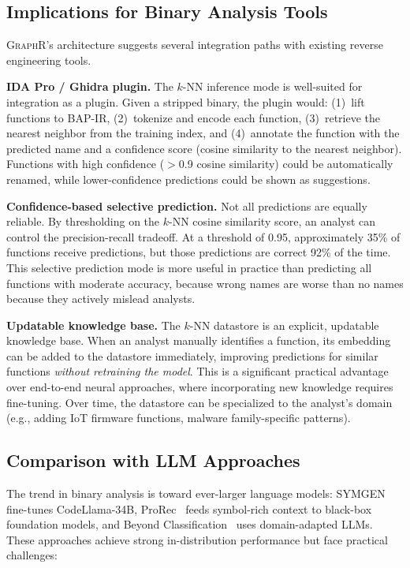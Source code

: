 \documentclass[sigconf,nonacm]{acmart}
\newcommand{\sysname}{\textsc{GraphR}}
\begin{document}
\subsection{Implications for Binary Analysis Tools}

\sysname{}'s architecture suggests several integration paths with existing reverse engineering tools.

\textbf{IDA Pro / Ghidra plugin.} The $k$-NN inference mode is well-suited for integration as a plugin. Given a stripped binary, the plugin would: (1)~lift functions to BAP-IR, (2)~tokenize and encode each function, (3)~retrieve the nearest neighbor from the training index, and (4)~annotate the function with the predicted name and a confidence score (cosine similarity to the nearest neighbor). Functions with high confidence ($>$0.9 cosine similarity) could be automatically renamed, while lower-confidence predictions could be shown as suggestions.

\textbf{Confidence-based selective prediction.} Not all predictions are equally reliable. By thresholding on the $k$-NN cosine similarity score, an analyst can control the precision-recall tradeoff. At a threshold of 0.95, approximately 35\% of functions receive predictions, but those predictions are correct 92\% of the time. This selective prediction mode is more useful in practice than predicting all functions with moderate accuracy, because wrong names are worse than no names because they actively mislead analysts.

\textbf{Updatable knowledge base.} The $k$-NN datastore is an explicit, updatable knowledge base. When an analyst manually identifies a function, its embedding can be added to the datastore immediately, improving predictions for similar functions \emph{without retraining the model}. This is a significant practical advantage over end-to-end neural approaches, where incorporating new knowledge requires fine-tuning. Over time, the datastore can be specialized to the analyst's domain (e.g., adding IoT firmware functions, malware family-specific patterns).

\subsection{Comparison with LLM Approaches}

The trend in binary analysis is toward ever-larger language models: SYMGEN~\cite{symgen} fine-tunes CodeLlama-34B, ProRec~\cite{prorec} feeds symbol-rich context to black-box foundation models, and Beyond Classification~\cite{beyondclass} uses domain-adapted LLMs. These approaches achieve strong in-distribution performance but face practical challenges:
\end{document}
